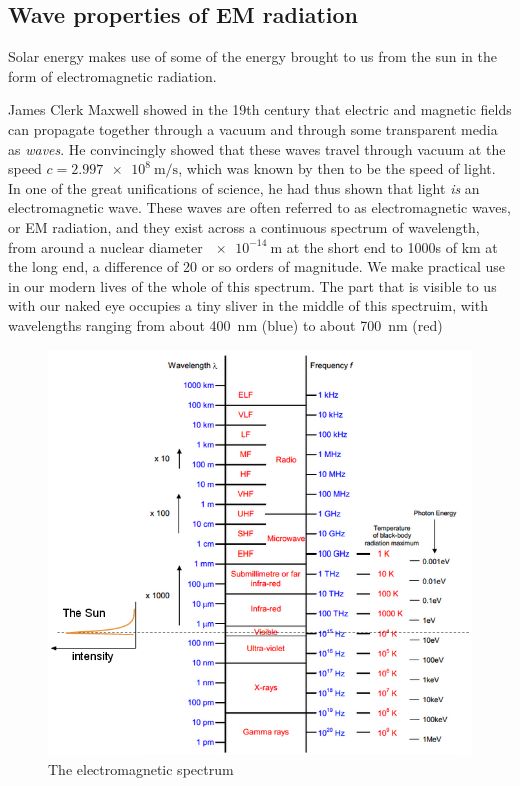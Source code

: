 \documentclass[class=scrartcl, crop=false,parskip=half]{standalone}
\begin{document}
\subsection{Wave properties of EM radiation}
Solar energy makes use of some of the energy brought to us from the sun in the form of electromagnetic radiation.

James Clerk Maxwell showed in the 19th century that electric and magnetic fields can propagate together through a vacuum and through some transparent media as \emph{waves}. He convincingly showed that these waves travel through vacuum at the speed $c=\SI{2.997e8}{\metre\per\second}$, which was known by then to be the speed of light. In one of the great unifications of science, he had thus shown that light \emph{is} an electromagnetic wave. These waves are often referred to as electromagnetic waves, or EM radiation, and they exist across a continuous spectrum of wavelength, from  around a nuclear diameter $\SI{e-14}{\metre}$ at the short end to 1000s of km at the long end, a difference of 20 or so orders of magnitude. We make practical use in our modern lives of the whole of this spectrum. The part that is visible to us with our naked eye occupies a tiny sliver in the middle of this spectruim, with wavelengths ranging from about \SI{400}{\nm} (blue) to about \SI{700}{\nm} (red)

\begin{figure}
\centering
\includegraphics[width=\textwidth]{../figures/em-spectrum-with-sun.png}
\caption{The electromagnetic spectrum}
\label{fig:em-spectrum}
\end{figure}
\end{document}
